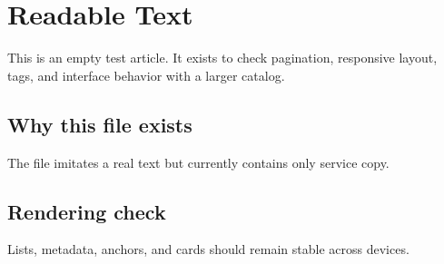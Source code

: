 \section{Readable Text}

This is an empty test article. It exists to check pagination, responsive layout, tags, and interface behavior with a larger catalog.

\subsection{Why this file exists}

The file imitates a real text but currently contains only service copy.

\subsection{Rendering check}

Lists, metadata, anchors, and cards should remain stable across devices.
